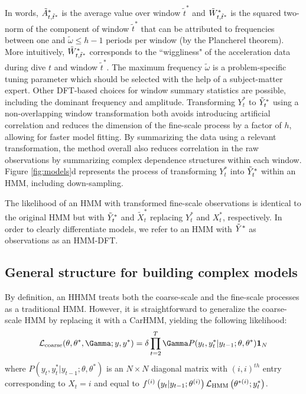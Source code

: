 In words, $\tilde{A}^*_{t,\tilde t^*}$ is the average value over window $\tilde t^*$ and $\tilde{W}^*_{t,\tilde t^*}$ is the squared two-norm of the component of window $\tilde t^*$ that can be attributed to frequencies between one and $\tilde{\omega} \leq h-1$ periods per window (by the Plancherel theorem). More intuitively, $\tilde{W}^*_{t,\tilde t^*}$ corresponds to the ``wiggliness" of the acceleration data during dive $t$ and window $\tilde t^*$. The maximum frequency $\tilde{\omega}$ is a problem-specific tuning parameter which should be selected with the help of a subject-matter expert. Other DFT-based choices for window summary statistics are possible, including the dominant frequency and amplitude. Transforming $Y^*_t$ to $\tilde{Y}^*_t$ using a non-overlapping window transformation both avoids introducing artificial correlation and reduces the dimension of the fine-scale process by a factor of $h$, allowing for faster model fitting. By summarizing the data using a relevant transformation, the method overall also reduces correlation in the raw observations by summarizing complex dependence structures within each window. Figure \ref{fig:models}d represents the process of transforming $Y^*_{t}$ into $\tilde{Y}^*_{t}$ within an HMM, including down-sampling.

%
The likelihood of an HMM with transformed fine-scale observations is identical to the original HMM but with $\tilde{Y}^*_t$ and $\tilde X^*_t$ replacing $Y^*_t$ and $X^*_t$, respectively. In order to clearly differentiate models, we refer to an HMM with $\tilde{Y}^*$ as observations as an HMM-DFT.

\subsection{General structure for building complex models}

By definition, an HHMM treats both the coarse-scale and the fine-scale processes as a traditional HMM. However, it is straightforward to generalize the coarse-scale HMM by replacing it with a CarHMM, yielding the following likelihood:
\[
\calL_{\text{coarse}}(\theta,\theta^*,\Gamma;y,y^*) = \delta \prod_{t=2}^T \Gamma P(y_t,y^*_t|y_{t-1};\theta,\theta^*) \mathbf{1}_N
\]
where $P(y_t,y^*_t|y_{t-1};\theta,\theta^*) $ is an $N \times N$ diagonal matrix with $(i,i)^{th}$ entry corresponding to $X_t=i$ and equal to $f^{(i)}\left(y_t|y_{t-1};\theta^{(i)}\right)\mathcal{L}_{\text{HMM}}\left(\theta^{*(i)};y^*_t\right)$. 

